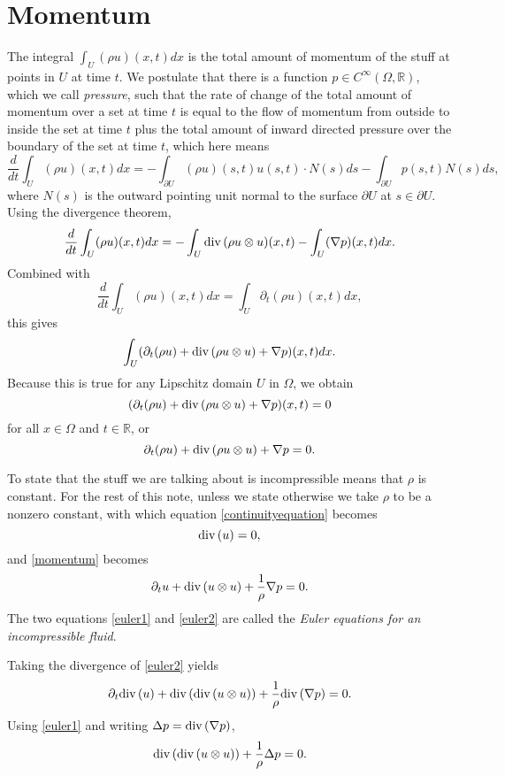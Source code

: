 \documentclass{article}
\renewcommand{\div}{\ensuremath\mathrm{div}\,}
\theoremstyle{definition}
\begin{document}
\section{Momentum}
The integral $\int_U (\rho u)(x,t) dx$ is the total amount of momentum of the stuff at points in $U$ at time $t$.
We postulate that there is a function $p \in C^\infty(\Omega,\mathbb{R})$, which we call {\em pressure}, such that the 
 rate of change of the total amount of momentum over a set at time $t$ is equal to 
  the flow of momentum from outside to inside the set at time $t$ plus 
 the total amount of inward directed
 pressure over the boundary of the set at time $t$, which
 here means
 \[
 \frac{d}{dt} \int_U (\rho u)(x,t) dx =-\int_{\partial U} (\rho u)(s,t) u(s,t) \cdot N(s) ds  - \int_{\partial U} p(s,t) N(s) ds,
 \]
 where $N(s)$ is the outward pointing unit normal to the surface $\partial U$ at $s \in \partial U$.
Using the divergence theorem,
\[
 \frac{d}{dt} \int_U (\rho u)(x,t) dx=
 -\int_U \div (\rho u \otimes u)(x,t)
- \int_U (\nabla p)(x,t) dx.
\]
Combined with 
\[
\frac{d}{dt} \int_U (\rho u)(x,t) dx=\int_U \partial_t (\rho u)(x,t) dx,
\]
this gives
\[
\int_U (\partial_t(\rho u) + \div(\rho u \otimes u) + \nabla p)(x,t) dx.
\]
Because this is true for any Lipschitz domain $U$ in $\Omega$, we obtain
\[
(\partial_t(\rho u) + \div(\rho u \otimes u) + \nabla p)(x,t)=0
\] 
for all $x \in \Omega$ and $t \in \mathbb{R}$, or
\begin{equation}
\partial_t(\rho u) + \div(\rho u \otimes u) + \nabla p=0.
\label{momentum}
\end{equation}

To state that the stuff we are talking about is incompressible means that 
$\rho$ is constant. For the rest of this note, unless we state otherwise we take $\rho$ to be a nonzero constant, with which   equation \eqref{continuityequation} becomes
\begin{equation}
\div (u)=0,
\label{euler1}
\end{equation}
and \eqref{momentum} becomes
\begin{equation}
\partial_t u + \div(u \otimes u) + \frac{1}{\rho} \nabla p =0.
\label{euler2}
\end{equation}
The two equations \eqref{euler1} and \eqref{euler2} are called the {\em Euler equations for an incompressible fluid}. 




Taking the divergence of \eqref{euler2} yields
\[
\partial_t \div(u) + \div (\div (u \otimes u)) + \frac{1}{\rho}\div(\nabla p)=0.
\]
Using \eqref{euler1} and writing $\Delta p = \div(\nabla p)$,
\begin{equation}
\div(\div(u \otimes u)) + \frac{1}{\rho} \Delta p =0.
\label{divergencepressure}
\end{equation}
\end{document}
